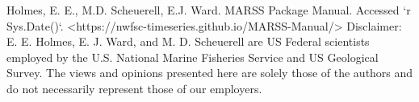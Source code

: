

\thispagestyle{empty}
\vspace*{14cm}
\vfil
\begin{flushleft}

Holmes, E. E., M.D. Scheuerell, E.J. Ward. MARSS Package Manual. Accessed `r Sys.Date()`. <https://nwfsc-timeseries.github.io/MARSS-Manual/>
\newline
\newline
Disclaimer: E. E. Holmes, E. J. Ward, and M. D. Scheuerell are US Federal scientists employed by the U.S. National Marine Fisheries Service and US Geological Survey.  The views and opinions presented here are solely those of the authors and do not necessarily represent those of our employers.

\end{flushleft}

